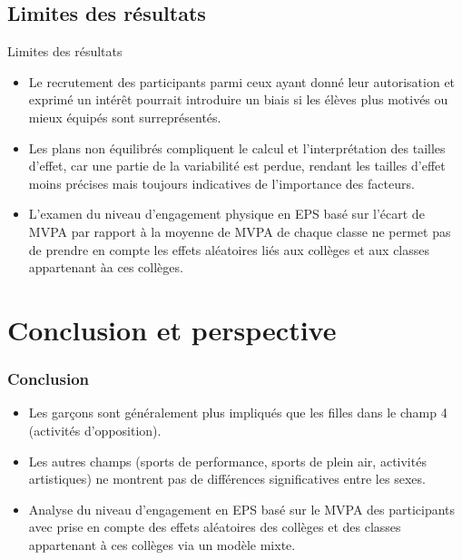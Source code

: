 \documentclass{beamer}
\begin{document}
	\subsection{Limites des résultats}
	\begin{frame}{Limites des résultats}
		\begin{itemize}
			\item Le recrutement des participants parmi ceux ayant donné leur autorisation et exprimé un intérêt pourrait introduire un biais si les élèves plus motivés ou mieux équipés sont surreprésentés.
			\vfill
			\pause
			\item Les plans non équilibrés compliquent le calcul et l'interprétation des tailles d'effet, car une partie de la variabilité est perdue, rendant les tailles d'effet moins précises mais toujours indicatives de l'importance des facteurs.
			\vfill
			\pause
			\item L'examen du niveau d'engagement physique en EPS basé sur l'écart de MVPA par rapport à la moyenne de MVPA de chaque classe ne permet pas de prendre en compte les effets aléatoires liés aux collèges et aux classes appartenant àa ces collèges.
		\end{itemize}
	\end{frame}
	
	\section{Conclusion et perspective}
	\begin{frame}
		\frametitle{Conclusion}
		\begin{itemize}
			\item Les garçons sont généralement plus impliqués que les filles dans le champ 4 (activités d'opposition).
			\vfill
			\item Les autres champs (sports de performance, sports de plein air, activités artistiques) ne montrent pas de différences significatives entre les sexes.
			\vfill
			\item Analyse du niveau d'engagement en EPS basé sur le MVPA des participants avec prise en compte des effets aléatoires des collèges et des classes appartenant à ces collèges via un modèle mixte.
		\end{itemize}
	\end{frame}
	
\end{document}
